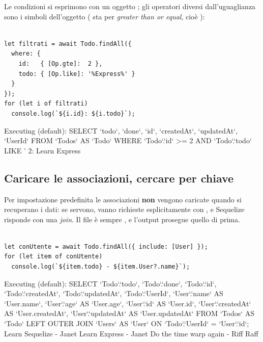 Le condizioni si esprimono con un oggetto ; gli operatori diversi
dall'uguaglianza sono i simboli dell'oggetto  ( sta per
\textit{greater than or equal}, cioè \code{>=}):

\begin{lstlisting}[style=js, name=leggi.js, firstnumber=7]

let filtrati = await Todo.findAll({
  where: {
    id:   { [Op.gte]:  2 },
    todo: { [Op.like]: '%Express%' }
  }
});
for (let i of filtrati)
  console.log(`${i.id}: ${i.todo}`);
\end{lstlisting}

\begin{console}
Executing (default): SELECT `todo`, `done`, `id`, `createdAt`, `updatedAt`, `UserId` FROM `Todos` AS `Todo` WHERE `Todo`.`id` >= 2 AND `Todo`.`todo` LIKE '%
2: Learn Express
\end{console}


\subsection{Caricare le associazioni, cercare per chiave}

Per impostazione predefinita le associazioni \textbf{non} vengono caricate
quando si recuperano i dati: se servono, vanno richieste esplicitamente con
, e Sequelize risponde con una \textit{join}. Il file è sempre
, e l'output prosegue quello di prima.

\begin{lstlisting}[style=js, name=leggi.js, firstnumber=16]

let conUtente = await Todo.findAll({ include: [User] });
for (let item of conUtente)
  console.log(`${item.todo} - ${item.User?.name}`);
\end{lstlisting}

\begin{console}
Executing (default): SELECT `Todo`.`todo`, `Todo`.`done`, `Todo`.`id`, `Todo`.`createdAt`, `Todo`.`updatedAt`, `Todo`.`UserId`, `User`.`name` AS `User.name`, `User`.`age` AS `User.age`, `User`.`id` AS `User.id`, `User`.`createdAt` AS `User.createdAt`, `User`.`updatedAt` AS `User.updatedAt` FROM `Todos` AS `Todo` LEFT OUTER JOIN `Users` AS `User` ON `Todo`.`UserId` = `User`.`id`;
Learn Sequelize - Janet
Learn Express - Janet
Do the time warp again - Riff Raff
\end{console}

